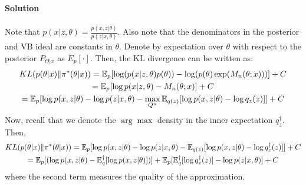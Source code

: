 \paragraph{Solution}

Note that $p(x|z,\theta) = \frac{p(x,z | \theta)}{p(z|x, \theta)}$. Also note that the denominators in the posterior and VB ideal are constants in $\theta$. Denote by expectation over $\theta$ with respect to the posterior $P_{\Theta|x}$ as $E_p[\cdot]$. Then, the KL divergence can be written as:
\begin{gather*}
KL(p(\theta|x) \| \pi^*(\theta|x)) = \mathbb{E}_p[\log (p(x|z, \theta) p(\theta)) - \log(p(\theta)\exp(M_n(\theta; x)))] + C \\
= \mathbb{E}_p[\log p(x|z, \theta) - M_n(\theta ; x)] + C \\
= \mathbb{E}_p[\log p(x,z| \theta) - \log p(z|x,\theta) - \max_{Q^n} \mathbb{E}_{q(z)}[\log p(x,z|\theta) - \log q_z(z)]] + C
\end{gather*}
Now, recall that we denote the $\arg \max$ density in the inner expectation $q_z^{\dagger}$. Then,
\begin{gather*}
 KL(p(\theta|x) \| \pi^*(\theta|x)) = \mathbb{E}_p[\log p(x,z| \theta) - \log p(z|x,\theta) - \mathbb{E}_{q(z)}[\log p(x,z|\theta) - \log q^{\dagger}_z(z)]] + C \\
 = \mathbb{E}_p[(\log p(x,z|\theta) - \mathbb{E}_q^{\dagger}[\log p(x,z|\theta)])] + \mathbb{E}_p[\mathbb{E}_q^{\dagger}[\log q_z^{\dagger}(z)] - \log p(z|x,\theta)] + C 
\end{gather*}
where the second term measures the quality of the approximation. 